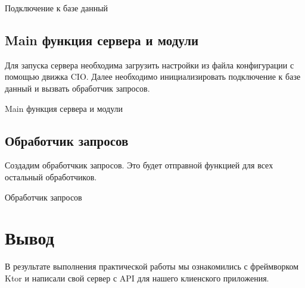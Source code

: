 \begin{image}
	\caption{Подключение к базе данный}
    \label{fig:connection}
\end{image}

\subsection{Main функция сервера и модули}

Для запуска сервера необходима загрузить настройки из файла конфигурации
с помощью движка CIO.
Далее необходимо инициализировать подключение к базе данный
и вызвать обработчик запросов.

\begin{image}
	\caption{Main функция сервера и модули}
    \label{fig:main}
\end{image}

\subsection{Обработчик запросов}

Создадим обработчкик запросов.
Это будет отправной функцией для всех остальный обработчиков.

\begin{image}
	\caption{Обработчик запросов}
    \label{fig:routing}
\end{image}


\clearpage

\section*{\LARGE Вывод}

В результате выполнения практической работы мы ознакомились с фреймворком Ktor
и написали свой сервер с API для нашего клиенского приложения.

